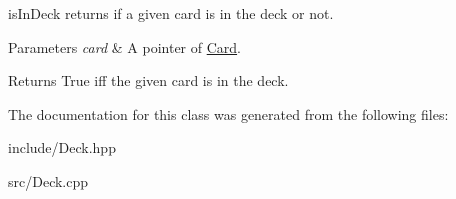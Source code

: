 is\-In\-Deck returns if a given card is in the deck or not. 


\begin{DoxyParams}{Parameters}
{\em card} & A pointer of \hyperlink{classCard}{Card}. \\
\hline
\end{DoxyParams}
\begin{DoxyReturn}{Returns}
True iff the given card is in the deck. 
\end{DoxyReturn}


The documentation for this class was generated from the following files\-:\begin{DoxyCompactItemize}
\item 
include/Deck.\-hpp\item 
src/Deck.\-cpp\end{DoxyCompactItemize}
